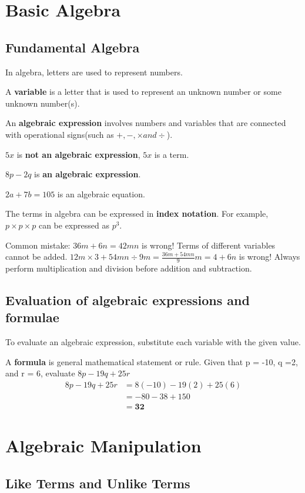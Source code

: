 \documentclass[../main]{subfiles}
\begin{document}
\section{Basic Algebra}

\subsection{Fundamental Algebra}
In algebra, letters are used to represent numbers.

A \textbf{variable} is a letter that is used to represent an unknown number or
some unknown number(s).

An \textbf{algebraic expression} involves numbers and variables that are
connected with operational signs(such as \(+, -, \times and \div\)).

\(5x\) is \textbf{not an algebraic expression}, \(5x\) is a term.

\(8p - 2q\) is \textbf{an algebraic expression}.

\(2a +7b = 105\) is an algebraic equation.

The terms in algebra can be expressed in \textbf{index notation}. For example,
\(p \times p \times p\) can be expressed as \(p^3\).

Common mistake:
\(36m + 6n = 42mn \) is wrong! Terms of different variables cannot be added.
\(12m \times 3 + 54mn \div 9m = \frac {36m + 54mn} 9m = 4 + 6n\) is wrong!
Always perform multiplication and division before addition and subtraction.

\subsection{Evaluation of algebraic expressions and formulae}
To evaluate an algebraic expression, substitute each variable with the given
value.

A \textbf{formula} is general mathematical statement or rule.
Given that p = -10, q =2, and r = 6, evaluate 
\(8p - 19q +25r\)
\begin{align*}
 8p-19q + 25 r &= 8(-10) - 19(2)+ 25(6)\\
               &= -80-38 +150 \\
               &=\mathbf{32}
\end{align*}

\section{Algebraic Manipulation}
\subsection{Like Terms and Unlike Terms}
\end{document}
